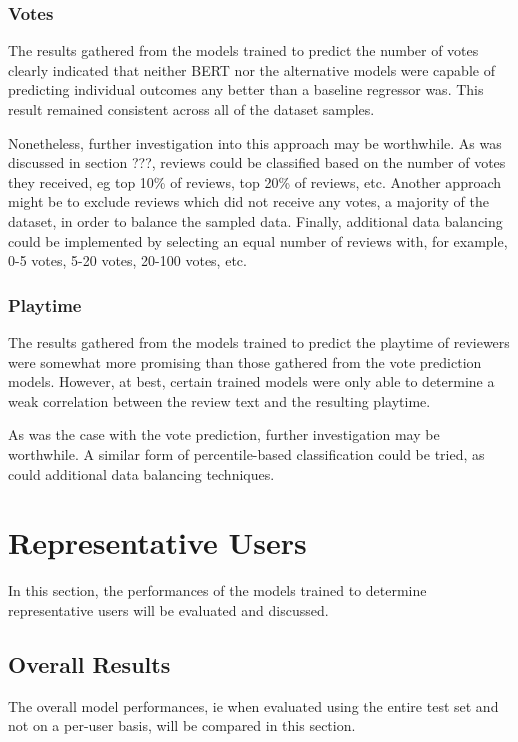 \subsubsection{Votes}

The results gathered from the models trained to predict the number of votes clearly indicated that neither BERT nor the alternative models were capable of predicting individual outcomes any better than a baseline regressor was. This result remained consistent across all of the dataset samples.

Nonetheless, further investigation into this approach may be worthwhile. As was discussed in section ???, reviews could be classified based on the number of votes they received, eg top 10\% of reviews, top 20\% of reviews, etc. Another approach might be to exclude reviews which did not receive any votes, a majority of the dataset, in order to balance the sampled data. Finally, additional data balancing could be implemented by selecting an equal number of reviews with, for example, 0-5 votes, 5-20 votes, 20-100 votes, etc.

\subsubsection{Playtime}

The results gathered from the models trained to predict the playtime of reviewers were somewhat more promising than those gathered from the vote prediction models. However, at best, certain trained models were only able to determine a weak correlation between the review text and the resulting playtime.

As was the case with the vote prediction, further investigation may be worthwhile. A similar form of percentile-based classification could be tried, as could additional data balancing techniques.

\section{Representative Users} \label{sec:Res_RU}

In this section, the performances of the models trained to determine representative users will be evaluated and discussed.

\subsection{Overall Results}

The overall model performances, ie when evaluated using the entire test set and not on a per-user basis, will be compared in this section.

